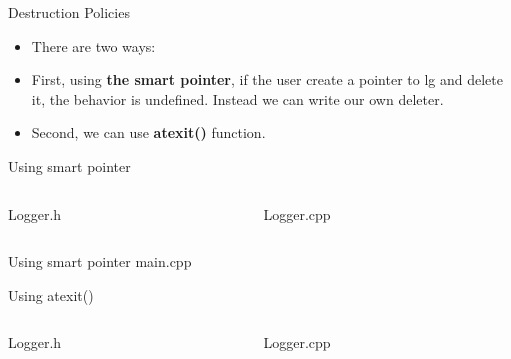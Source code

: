 \documentclass[13pt]{beamer}
\begin{document}
\begin{frame}{Destruction Policies}
\begin{itemize}
\setlength\itemsep{1em}

\item There are two ways:

\item First, using \textbf{the smart pointer}, if the user create a pointer to lg and delete it, the behavior is undefined. Instead we can write our own deleter.

\item Second, we can use \textbf{atexit()} function.
\end{itemize}
\end{frame}

\begin{frame}{Using smart pointer}
\begin{columns}[T]
\begin{column}{.48\textwidth}
Logger.h
\lstset{basicstyle=\tiny,style=myCustomCppStyle}

\end{column}

\begin{column}{.48\textwidth}
Logger.cpp
\lstset{basicstyle=\tiny,style=myCustomCppStyle}

\end{column}
\end{columns}
\end{frame}

\begin{frame}{Using smart pointer}
main.cpp
\lstset{basicstyle=\tiny,style=myCustomCppStyle}

\end{frame}

\begin{frame}{Using atexit()}
\begin{columns}[T]
\begin{column}{.48\textwidth}
Logger.h
\lstset{basicstyle=\tiny,style=myCustomCppStyle}

\end{column}

\begin{column}{.48\textwidth}
Logger.cpp
\lstset{basicstyle=\tiny,style=myCustomCppStyle}

\end{column}
\end{columns}
\end{frame}
\end{document}
